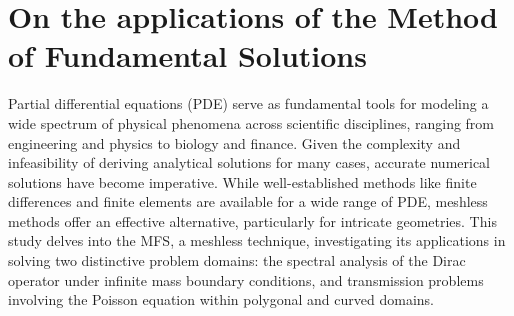 \label{chap:intro}




\section{On the applications of the Method of Fundamental Solutions}

Partial differential equations (\ac{PDE}) serve as fundamental tools for modeling a wide spectrum of physical phenomena across scientific disciplines, ranging from engineering and physics to biology and finance. Given the complexity and infeasibility of deriving analytical solutions for many cases, accurate numerical solutions have become imperative. While well-established methods like finite differences and finite elements are available for a wide range of \ac{PDE}, meshless methods offer an effective alternative, particularly for intricate geometries. This study delves into the \ac{MFS}, a meshless technique, investigating its applications in solving two distinctive problem domains: the spectral analysis of the Dirac operator under infinite mass boundary conditions, and transmission problems involving the Poisson equation within polygonal and curved domains.

